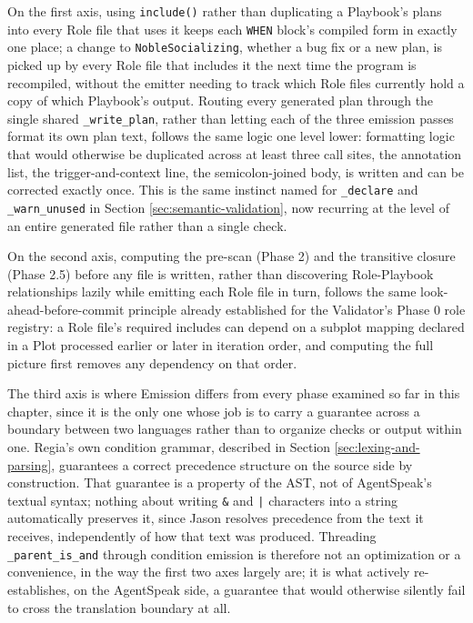 On the first axis, using \lstinline|include()| rather than duplicating a Playbook's plans into every Role file that uses it keeps each \lstinline|WHEN| block's compiled form in exactly one place; a change to \lstinline|NobleSocializing|, whether a bug fix or a new plan, is picked up by every Role file that includes it the next time the program is recompiled, without the emitter needing to track which Role files currently hold a copy of which Playbook's output. Routing every generated plan through the single shared \lstinline|_write_plan|, rather than letting each of the three emission passes format its own plan text, follows the same logic one level lower: formatting logic that would otherwise be duplicated across at least three call sites, the annotation list, the trigger-and-context line, the semicolon-joined body, is written and can be corrected exactly once. This is the same instinct named for \lstinline|_declare| and \lstinline|_warn_unused| in Section \ref{sec:semantic-validation}, now recurring at the level of an entire generated file rather than a single check.

On the second axis, computing the pre-scan (Phase 2) and the transitive closure (Phase 2.5) before any file is written, rather than discovering Role-Playbook relationships lazily while emitting each Role file in turn, follows the same look-ahead-before-commit principle already established for the Validator's Phase 0 role registry: a Role file's required includes can depend on a subplot mapping declared in a Plot processed earlier or later in iteration order, and computing the full picture first removes any dependency on that order.

The third axis is where Emission differs from every phase examined so far in this chapter, since it is the only one whose job is to carry a guarantee across a boundary between two languages rather than to organize checks or output within one. Regia's own condition grammar, described in Section \ref{sec:lexing-and-parsing}, guarantees a correct precedence structure on the source side by construction. That guarantee is a property of the AST, not of AgentSpeak's textual syntax; nothing about writing \lstinline|&| and \lstinline+|+ characters into a string automatically preserves it, since Jason resolves precedence from the text it receives, independently of how that text was produced. Threading \lstinline|_parent_is_and| through condition emission is therefore not an optimization or a convenience, in the way the first two axes largely are; it is what actively re-establishes, on the AgentSpeak side, a guarantee that would otherwise silently fail to cross the translation boundary at all.

